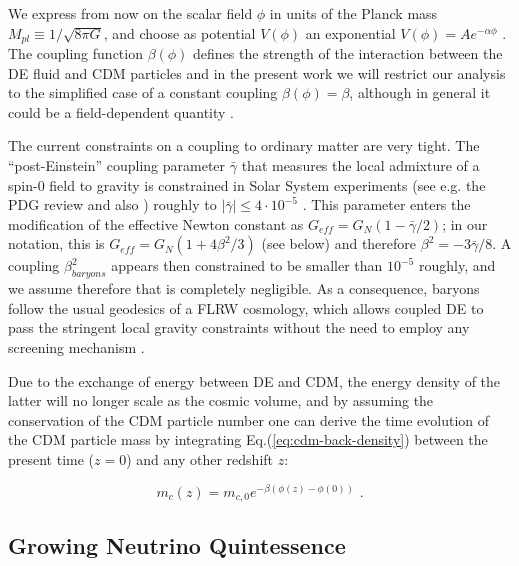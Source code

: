 We express from now on the scalar field $\phi$ in units of the Planck
mass $M_{pl}\equiv1/\sqrt{8\pi G}$, and choose as potential $V(\phi)$
an exponential $V(\phi)=Ae^{-\alpha\phi}$ \citep{Lucchin_Matarrese_1984,Wetterich_1988}.
The coupling function $\beta(\phi)$ defines the strength of the interaction
between the DE fluid and CDM particles and in the present work we
will restrict our analysis to the simplified case of a constant coupling
$\beta(\phi)=\beta$, although in general it could be a field-dependent
quantity \cite{Amendola_2004,Baldi_2011a}.

The current constraints on a coupling to ordinary matter are very
tight. The ``post-Einstein'' coupling parameter $\bar{\gamma}$
that measures the local admixture of a spin-0 field to gravity is
constrained in Solar System experiments (see e.g. the PDG review \cite{Agashe:2014kda}
and also \citep{Will_2005,Bertotti_Iess_Tortora_2003}) roughly to
$|\bar{\gamma}|\le4\cdot10^{-5}$ . This parameter enters the modification
of the effective Newton constant as $G_{eff}=G_{N}(1-\bar{\gamma}/2)$;
in our notation, this is $G_{eff}=G_{N}(1+4\beta^{2}/3)$ (see below)
and therefore $\beta^{2}=-3\bar{\gamma}/8$. A coupling $\beta_{baryons}^{2}$
appears then constrained to be smaller than $10^{-5}$ roughly, and
we assume therefore that is completely negligible. As a consequence,
baryons follow the usual geodesics of a FLRW cosmology, which allows
coupled DE to pass the stringent local gravity constraints without
the need to employ any screening mechanism \citep{2015arXiv150203888H}.

Due to the exchange of energy between DE and CDM, the energy density
of the latter will no longer scale as the cosmic volume, and by assuming
the conservation of the CDM particle number one can derive the time
evolution of the CDM particle mass by integrating Eq.(\ref{eq:cdm-back-density})
between the present time ($z=0$) and any other redshift $z$:

\begin{equation}
m_{c}(z)=m_{c,0}e^{-\beta(\phi(z)-\phi(0))}\,\,.
\end{equation}


\subsection{Growing Neutrino Quintessence}

